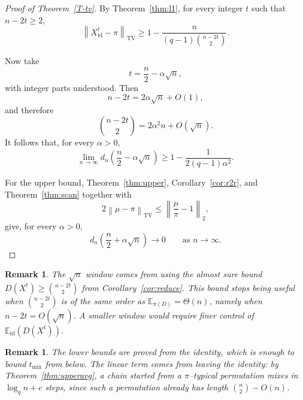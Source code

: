\documentclass[11pt]{article}
\theoremstyle{plain}  %
\newtheorem{remark}[theorem]{Remark}
\begin{document}
\begin{proof}[Proof of Theorem~\ref{T-tv}]
By Theorem~\ref{thm:l1}, for every integer $t$ such that $n-2t\ge 2$,
\[
\left\|X_{\mathrm{id}}^t-\pi\right\|_{\mathrm{TV}}
\ge
1-
\frac{n}
{(q-1)\binom{n-2t}{2}}.
\]

Now take
\[
t=\frac{n}{2}-\alpha\sqrt{n},
\]
with integer parts understood. Then
\[
n-2t=2\alpha\sqrt{n}+O(1),
\]
and therefore
\[
\binom{n-2t}{2}
=
2\alpha^2 n+O(\sqrt{n}).
\]
It follows that, for every $\alpha>0$,
\[
\lim_{n\to\infty}
d_n\left(\frac{n}{2}-\alpha\sqrt{n}\right)
\ge
1-\frac{1}{2(q-1)\alpha^2}.
\]

For the upper bound, Theorem~\ref{thm:upper}, Corollary~\ref{cor:r2r}, and Theorem~\ref{thm:scan} together with 
\[
2\left\|\mu-\pi\right\|_{\mathrm{TV}}
\le
\left\|\frac{\mu}{\pi}-1\right\|_2,
\]
give, for every $\alpha>0$,
\[
d_n\left(\frac{n}{2}+\alpha\sqrt{n}\right)
\longrightarrow 0
\qquad\text{as } n\to\infty.
\]

\end{proof}




\begin{remark}\label{rem:window}
The $\sqrt n$ window comes from using the almost sure bound $D(X^t)\geq \binom{n-2t}{2}$ from Corollary~\ref{cor:reduce}. This bound stops being useful when
$\binom{n-2t}{2}$ is of the same order as
$\mathbb{E}_{\pi(D)}=\Theta(n)$, namely when $n-2t=O(\sqrt n)$. A smaller window
would require finer control of $\mathbb{E}_{\mathrm{id}}(D(X^t))$.
\end{remark}

\begin{remark}\label{rem:identity}
The lower bounds are proved from the identity, which is enough to bound
$t_{\mathrm{mix}}$ from below. The linear term comes from leaving the identity:
by Theorem~\ref{thm:upperavg}, a chain started from a $\pi$--typical permutation
mixes in $\log_q n+c$ steps, since such a permutation already has length
$\binom n2-O(n)$.
\end{remark}


\end{document}
